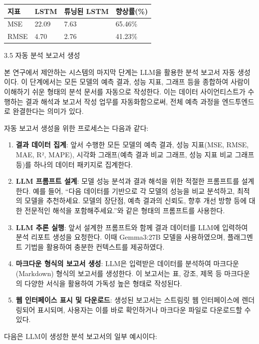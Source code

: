 \documentclass[12pt,ko,a4,]{report}
\begin{document}
\begin{longtable}[]{@{}llll@{}}
\toprule\noalign{}
지표 & LSTM & 튜닝된 LSTM & 향상률(\%) \\
\midrule\noalign{}
\endhead
\bottomrule\noalign{}
\endlastfoot
MSE & 22.09 & 7.63 & 65.46\% \\
RMSE & 4.70 & 2.76 & 41.23\% \\
\end{longtable}

3.5 자동 분석 보고서 생성

본 연구에서 제안하는 시스템의 마지막 단계는 LLM을 활용한 분석 보고서
자동 생성이다. 이 단계에서는 모든 모델의 예측 결과, 성능 지표, 그래프
등을 종합하여 사람이 이해하기 쉬운 형태의 분석 문서를 자동으로 작성한다.
이는 데이터 사이언티스트가 수행하는 결과 해석과 보고서 작성 업무를
자동화함으로써, 전체 예측 과정을 엔드투엔드로 완결한다는 의미가 있다.

자동 보고서 생성을 위한 프로세스는 다음과 같다:

\begin{enumerate}
\def\labelenumi{\arabic{enumi}.}
\item
  \textbf{결과 데이터 집계}: 앞서 수행한 모든 모델의 예측 결과, 성능
  지표(MSE, RMSE, MAE, R², MAPE), 시각화 그래프(예측 결과 비교 그래프,
  성능 지표 비교 그래프 등)를 하나의 데이터 패키지로 집계한다.
\item
  \textbf{LLM 프롬프트 설계}: 모델 성능 분석과 결과 해석을 위한 적절한
  프롬프트를 설계한다. 예를 들어, ``다음 데이터를 기반으로 각 모델의
  성능을 비교 분석하고, 최적의 모델을 추천하세요. 모델의 장단점, 예측
  결과의 신뢰도, 향후 개선 방향 등에 대한 전문적인 해석을
  포함해주세요.''와 같은 형태의 프롬프트를 사용한다.
\item
  \textbf{LLM 추론 실행}: 앞서 설계한 프롬프트와 함께 결과 데이터를
  LLM에 입력하여 분석 리포트 생성을 요청한다. 이때 Gemma3:27B 모델을
  사용하였으며, 플래그멘트 기법을 활용하여 충분한 컨텍스트를 제공하였다.
\item
  \textbf{마크다운 형식의 보고서 생성}: LLM은 입력받은 데이터를 분석하여
  마크다운(Markdown) 형식의 보고서를 생성한다. 이 보고서는 표, 강조,
  제목 등 마크다운의 다양한 서식을 활용하여 가독성 높은 형태로 작성된다.
\item
  \textbf{웹 인터페이스 표시 및 다운로드}: 생성된 보고서는 스트림릿 웹
  인터페이스에 렌더링되어 표시되며, 사용자는 이를 바로 확인하거나
  마크다운 파일로 다운로드할 수 있다.
\end{enumerate}

다음은 LLM이 생성한 분석 보고서의 일부 예시이다:
\end{document}
